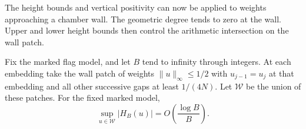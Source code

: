 The height bounds and vertical positivity can now be applied to weights approaching a chamber wall. The geometric degree tends to zero at the wall. Upper and lower height bounds then control the arithmetic intersection on the wall patch.



\begin{lemma}\label{lem:flag-wall-small}
Fix the marked flag model, and let \(B\) tend to infinity through
integers. At each embedding take the wall patch of weights
\(\|u\|_\infty\le1/2\) with \(u_{j-1}=u_j\) at that embedding
and all other successive gaps at least \(1/(4N)\).
Let \(\mathcal W\) be the union of these patches. For the fixed marked model,
\[
 \sup_{u\in\mathcal W}|H_B(u)|=O\!\left(\frac{\log B}{B}\right).
\]

\end{lemma}

